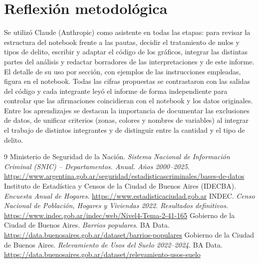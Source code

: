 \documentclass[11pt,a4paper]{article}
\begin{document}
\section{Reflexión metodológica}
Se utilizó Claude (Anthropic) como asistente en todas las etapas: para revisar la estructura del notebook frente a las pautas, decidir el tratamiento de nulos y tipos de delito, escribir y adaptar el código de los gráficos, integrar las distintas partes del análisis y redactar borradores de las interpretaciones y de este informe. El detalle de su uso por sección, con ejemplos de las instrucciones empleadas, figura en el notebook. Todas las cifras propuestas se contrastaron con las salidas del código y cada integrante leyó el informe de forma independiente para controlar que las afirmaciones coincidieran con el notebook y los datos originales. Entre los aprendizajes se destacan la importancia de documentar las exclusiones de datos, de unificar criterios (zonas, colores y nombres de variables) al integrar el trabajo de distintos integrantes y de distinguir entre la cantidad y el tipo de delito.

\begin{thebibliography}{9}
\small
{} Ministerio de Seguridad de la Nación. \textit{Sistema Nacional de Información Criminal (SNIC) -- Departamentos. Anual. Años 2000--2025}. \url{https://www.argentina.gob.ar/seguridad/estadisticascriminales/bases-de-datos}
 Instituto de Estadística y Censos de la Ciudad de Buenos Aires (IDECBA). \textit{Encuesta Anual de Hogares}. \url{https://www.estadisticaciudad.gob.ar}
 INDEC. \textit{Censo Nacional de Población, Hogares y Viviendas 2022. Resultados definitivos}. \url{https://www.indec.gob.ar/indec/web/Nivel4-Tema-2-41-165}
 Gobierno de la Ciudad de Buenos Aires. \textit{Barrios populares}. BA Data. \url{https://data.buenosaires.gob.ar/dataset/barrios-populares}
 Gobierno de la Ciudad de Buenos Aires. \textit{Relevamiento de Usos del Suelo 2022--2024}. BA Data. \url{https://data.buenosaires.gob.ar/dataset/relevamiento-usos-suelo}
\end{thebibliography}
\end{document}

